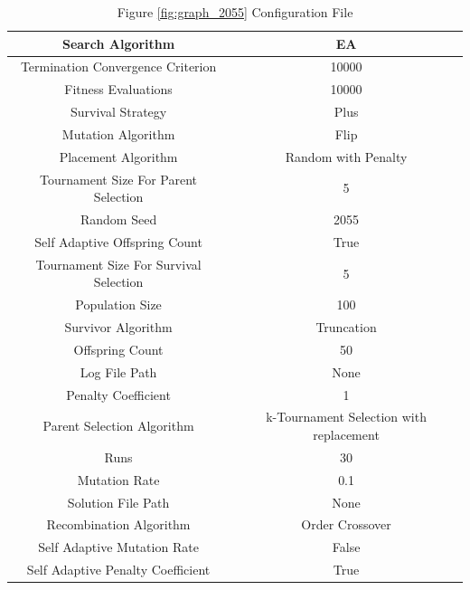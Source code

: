 \documentclass{standalone}
\begin{document}
\begin{table}[!htb]
	\centering
	\caption{Figure \ref{fig:graph_2055} Configuration File}
	\label{tab:graph_2055}
	\begin{tabular}{| c | c |}
		\hline
		Search Algorithm		& EA		 \\
		\hline
		Termination Convergence Criterion		& 10000		 \\
		\hline
		Fitness Evaluations		& 10000		 \\
		\hline
		Survival Strategy		& Plus		 \\
		\hline
		Mutation Algorithm		& Flip		 \\
		\hline
		Placement Algorithm		& Random with Penalty		 \\
		\hline
		Tournament Size For Parent Selection		& 5		 \\
		\hline
		Random Seed		& 2055		 \\
		\hline
		Self Adaptive Offspring Count		& True		 \\
		\hline
		Tournament Size For Survival Selection		& 5		 \\
		\hline
		Population Size		& 100		 \\
		\hline
		Survivor Algorithm		& Truncation		 \\
		\hline
		Offspring Count		& 50		 \\
		\hline
		Log File Path		& None		 \\
		\hline
		Penalty Coefficient		& 1		 \\
		\hline
		Parent Selection Algorithm		& k-Tournament Selection with replacement		 \\
		\hline
		Runs		& 30		 \\
		\hline
		Mutation Rate		& 0.1		 \\
		\hline
		Solution File Path		& None		 \\
		\hline
		Recombination Algorithm		& Order Crossover		 \\
		\hline
		Self Adaptive Mutation Rate		& False		 \\
		\hline
		Self Adaptive Penalty Coefficient		& True		 \\
		\hline
	\end{tabular}
\end{table}
\end{document}
